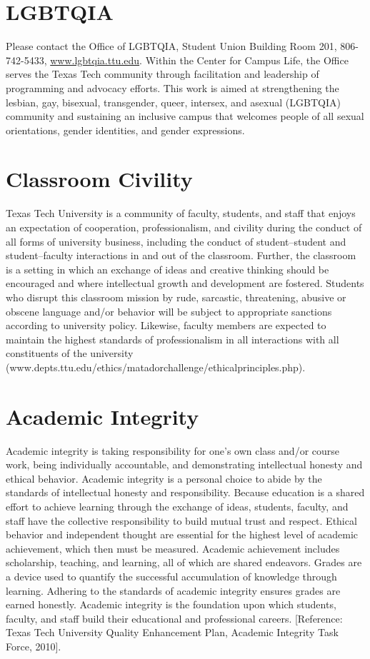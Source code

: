 \documentclass[12pt, notitlepage]{article}   	%
\begin{document}
{\section{LGBTQIA}
Please contact the Office of LGBTQIA, Student Union Building Room 201, 806-742-5433, 
\url{www.lgbtqia.ttu.edu}. 
Within the Center for Campus Life, the Office serves the Texas Tech community 
through facilitation and leadership of programming and advocacy efforts. 
This work is aimed at strengthening the lesbian, gay, bisexual, transgender, queer, 
intersex, and asexual (LGBTQIA) community and sustaining an inclusive campus that 
welcomes people of all sexual orientations, gender identities, and gender expressions. 

\section{Classroom Civility}
Texas Tech University is a community of faculty, students, and staff that enjoys 
an expectation of cooperation, professionalism, and civility during the conduct of all 
forms of university business, including the conduct of student–student and student–faculty 
interactions in and out of the classroom. 
Further, the classroom is a setting in which an exchange of ideas and creative thinking 
should be encouraged and where intellectual growth and development are fostered. 
Students who disrupt this classroom mission by rude, sarcastic, threatening, abusive or 
obscene language and/or behavior will be subject to appropriate sanctions according to 
university policy.  Likewise, faculty members are expected to maintain the highest standards of professionalism in all interactions with all constituents of the university (www.depts.ttu.edu/ethics/matadorchallenge/ethicalprinciples.php).

\section{Academic Integrity}
Academic integrity is taking responsibility for one’s own class and/or course work, 
being individually accountable, and demonstrating intellectual honesty and ethical behavior. 
Academic integrity is a personal choice to abide by the standards of intellectual honesty 
and responsibility. 
Because education is a shared effort to achieve learning through the exchange of ideas, 
students, faculty, and staff have the collective responsibility to build mutual trust and respect. 
Ethical behavior and independent thought are essential for the highest level of academic 
achievement, which then must be measured. 
Academic achievement includes scholarship, teaching, and learning, all of which are shared endeavors. 
Grades are a device used to quantify the successful accumulation of knowledge through learning. 
Adhering to the standards of academic integrity ensures grades are earned honestly. 
Academic integrity is the foundation upon which students, faculty, and staff build their 
educational and professional careers. [Reference: Texas Tech University Quality 
Enhancement Plan, Academic Integrity Task Force, 2010].

}
\end{document}
